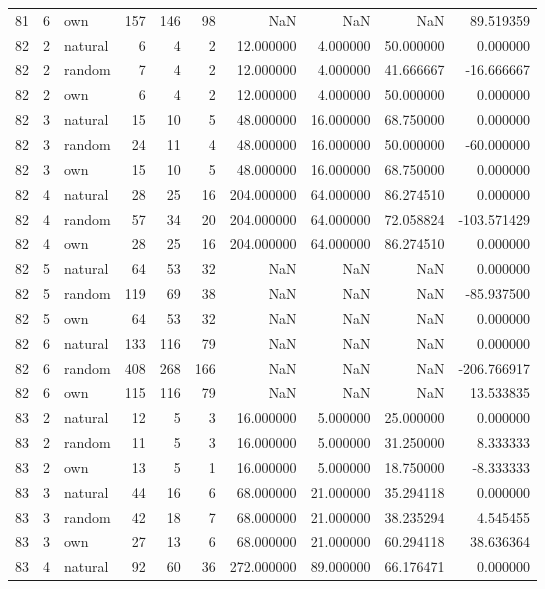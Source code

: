 \begin{table}[htbp]
\begin{tabular}{rrlrrrrrrr}
81 & 6 & own & 157 & 146 & 98 & NaN & NaN & NaN & 89.519359 \\
82 & 2 & natural & 6 & 4 & 2 & 12.000000 & 4.000000 & 50.000000 & 0.000000 \\
82 & 2 & random & 7 & 4 & 2 & 12.000000 & 4.000000 & 41.666667 & -16.666667 \\
82 & 2 & own & 6 & 4 & 2 & 12.000000 & 4.000000 & 50.000000 & 0.000000 \\
82 & 3 & natural & 15 & 10 & 5 & 48.000000 & 16.000000 & 68.750000 & 0.000000 \\
82 & 3 & random & 24 & 11 & 4 & 48.000000 & 16.000000 & 50.000000 & -60.000000 \\
82 & 3 & own & 15 & 10 & 5 & 48.000000 & 16.000000 & 68.750000 & 0.000000 \\
82 & 4 & natural & 28 & 25 & 16 & 204.000000 & 64.000000 & 86.274510 & 0.000000 \\
82 & 4 & random & 57 & 34 & 20 & 204.000000 & 64.000000 & 72.058824 & -103.571429 \\
82 & 4 & own & 28 & 25 & 16 & 204.000000 & 64.000000 & 86.274510 & 0.000000 \\
82 & 5 & natural & 64 & 53 & 32 & NaN & NaN & NaN & 0.000000 \\
82 & 5 & random & 119 & 69 & 38 & NaN & NaN & NaN & -85.937500 \\
82 & 5 & own & 64 & 53 & 32 & NaN & NaN & NaN & 0.000000 \\
82 & 6 & natural & 133 & 116 & 79 & NaN & NaN & NaN & 0.000000 \\
82 & 6 & random & 408 & 268 & 166 & NaN & NaN & NaN & -206.766917 \\
82 & 6 & own & 115 & 116 & 79 & NaN & NaN & NaN & 13.533835 \\
83 & 2 & natural & 12 & 5 & 3 & 16.000000 & 5.000000 & 25.000000 & 0.000000 \\
83 & 2 & random & 11 & 5 & 3 & 16.000000 & 5.000000 & 31.250000 & 8.333333 \\
83 & 2 & own & 13 & 5 & 1 & 16.000000 & 5.000000 & 18.750000 & -8.333333 \\
83 & 3 & natural & 44 & 16 & 6 & 68.000000 & 21.000000 & 35.294118 & 0.000000 \\
83 & 3 & random & 42 & 18 & 7 & 68.000000 & 21.000000 & 38.235294 & 4.545455 \\
83 & 3 & own & 27 & 13 & 6 & 68.000000 & 21.000000 & 60.294118 & 38.636364 \\
83 & 4 & natural & 92 & 60 & 36 & 272.000000 & 89.000000 & 66.176471 & 0.000000 \\

\end{tabular}
\end{table}
